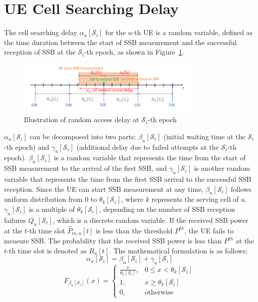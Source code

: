 \section{UE Cell Searching Delay}
The cell searching delay $\alpha_u[\mathcal{S}_i]$ for the $u$-th UE is a random variable, defined as the time duration between the start of SSB measurement and the successful reception of SSB at the $\mathcal{S}_i$-th epoch, as shown in Figure~\ref{RAD}. 
\begin{figure}[h!]
    \centering
    \includegraphics[width=0.8\textwidth]{figure/random access delay.pdf}
    \caption{Illustration of random access delay at $\mathcal{S}_i$-th epoch}
    \label{RAD}
\end{figure}
$\alpha_u[\mathcal{S}_i]$ can be decomposed into two parts: $\beta_u[\mathcal{S}_i]$ (initial waiting time at the $\mathcal{S}_i$-th epoch) and $\gamma_u[\mathcal{S}_i]$ (additional delay due to failed attempts at the $\mathcal{S}_i$-th epoch). $\beta_u[\mathcal{S}_i]$ is a random variable that represents the time from the start of SSB measurement to the arrival of the first SSB, and $\gamma_u[\mathcal{S}_i]$ is another random variable that represents the time from the first SSB arrival to the successful SSB reception. Since the UE can start SSB measurement at any time, $\beta_u[\mathcal{S}_i]$ follows uniform distribution from $0$ to $\theta_k[\mathcal{S}_i]$, where $k$ represents the serving cell of $u$. $\gamma_u[\mathcal{S}_i]$ is a multiple of $\theta_k[\mathcal{S}_i]$, depending on the number of SSB reception failures $Q_u[\mathcal{S}_i]$, which is a discrete random variable. If the received SSB power at the $t$-th time slot $\hat{P}_{m, u}[t]$ is less than the threshold $P^{th}$, the UE fails to measure SSB. The probability that the received SSB power is less than $P^{th}$ at the $t$-th time slot is denoted as $R_u[t]$. The mathematical formulation is as follows:
\begin{equation}
    \alpha_u[\mathcal{S}_i] = \beta_u[\mathcal{S}_i] + \gamma_u[\mathcal{S}_i] \label{eq:alpha}
\end{equation}
\begin{equation}
    F_{\beta_u[\mathcal{S}_i]}(x) =
    \begin{cases}
        \frac{x}{\theta_k[\mathcal{S}_i]}, & 0 \leq x < \theta_k[\mathcal{S}_i] \\
        1, & x \geq \theta_k[\mathcal{S}_i] \\
        0, & \text{otherwise}
    \end{cases}
\end{equation}
